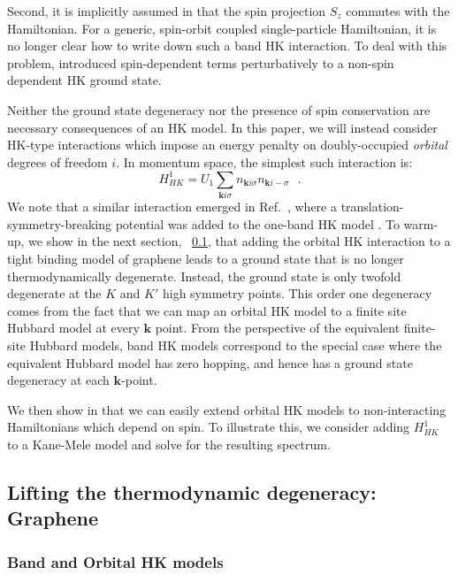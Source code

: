 \documentclass[prb,aps,amssymb,twocolumn,notitlepage]{revtex4-2}
\begin{document}
Second, it is implicitly assumed in  that the spin projection $S_{z}$ commutes with the Hamiltonian. 
For a generic, spin-orbit coupled single-particle Hamiltonian, it is no longer clear how to write down such a band HK interaction. 
To deal with this problem, \cite{setty2023symmetry} introduced spin-dependent terms perturbatively to a non-spin dependent HK ground state.

Neither the ground state degeneracy nor the presence of spin conservation are necessary consequences of an HK model. 
In this paper, we will instead consider HK-type interactions which impose an energy penalty on doubly-occupied \textit{orbital} degrees of freedom $i$. 
In momentum space, the simplest such interaction is:
\begin{equation}\label{eq:bandhkgeneral}
    H^{1}_{HK}=U_{1}\sum_{\mathbf{k}i\sigma}n_{\mathbf{k}i\sigma}n_{\mathbf{k}i-\sigma}\text{ 
}.
\end{equation}
 We note that a similar interaction emerged in Ref.~\cite{2023Wysokynski}, where a translation-symmetry-breaking potential was added to the one-band HK model . 
 To warm-up, we show in the next section, ~\ref{subsec:graphene}, that adding the orbital HK interaction  to a tight binding model of graphene leads to a ground state that is no longer thermodynamically degenerate. 
Instead, the ground state is only twofold degenerate at the $K$ and $K'$ high symmetry points. 
This order one degeneracy comes from the fact that we can map an orbital HK model to a finite site Hubbard model at every $\mathbf{k}$ point. 
From the perspective of the equivalent finite-site Hubbard models, band HK models correspond to the special case where the equivalent Hubbard model has zero hopping, and hence has a ground state degeneracy at each $\mathbf{k}$-point.

We then show in  that we can easily extend orbital HK models to non-interacting Hamiltonians which depend on spin. 
To illustrate this, we consider adding $H^{1}_{HK}$ to a Kane-Mele model and solve for the resulting spectrum.




\subsection{Lifting the thermodynamic degeneracy: Graphene}
\label{subsec:graphene}
\subsubsection{Band and Orbital HK models}
\end{document}
